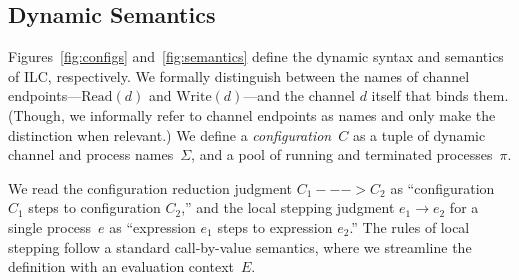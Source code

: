 \begin{comment}
The fork rule says that that if we can appropriately split the affine context
such that the child process $e_1$ has type $A$ and mode $m_1$ and the
``continue'' process $e_2$ has type $B$ and mode $m_2$, then the whole
expression has type $B$ and mode $m_3$, which is derived by composing $m_1$ and
$m_2$ in parallel. Again, we emphasize that composing two write mode processes
in parallel violates type checking, i.e., $\Wm ;; \Wm => p$ cannot be derived
for any mode $p$.

Finally, the choice rule says that if we can appropriately split the affine
context such that both subexpressions $A$ and mode $R$, then the whole
expression follows exactly.

\paragraph{Affine rules.} The affine typing rules are, for the most part, analagous to their
intuitionistic counterparts. Two differences bear mentioning. First, the bang!
rule only lifts intuitionistically typed expressions that are closed with
respect to affine variables into an affinely typed expression. Otherwise, one
could wrap an intuitionistically typed expression with free affine variables in
a bang! and use it in an unrestricted manner. Second, in contrast with the abs
rule, the lollipop rule does not require function bodies to be free with respect
to affine variables.
\end{comment}

\subsection{Dynamic Semantics}
\label{subsec:semantics}

Figures~\ref{fig:configs} and~\ref{fig:semantics} define the dynamic syntax and
semantics of ILC, respectively.
%
We formally distinguish between the names of channel endpoints---$\textrm{Read}(d)$ and
$\textrm{Write}(d)$---and the channel $d$ itself that binds them. (Though, we informally
refer to channel endpoints as names and only make the distinction when
relevant.)  We define a \emph{configuration}~$C$ as a tuple of dynamic channel
and process names~$\Sigma$, and a pool of running and terminated
processes~$\pi$.

We read the configuration reduction judgment $C_1 ---> C_2$ as ``configuration
$C_1$ steps to configuration $C_2$,'' 
%
and the local stepping judgment $e_1 \longrightarrow e_2$ for a single process~$e$ as
``expression $e_1$ steps to expression $e_2$.''
%
The rules of local stepping follow a standard call-by-value semantics, 
where we streamline the definition with an evaluation context~$E$.

